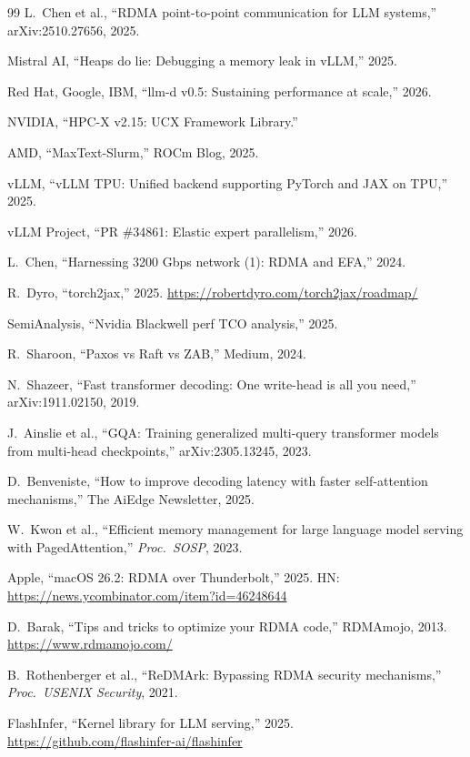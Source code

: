 \documentclass[11pt]{article}
\begin{document}
\begin{thebibliography}{99}
L.~Chen et al., ``RDMA point-to-point communication for LLM systems,'' arXiv:2510.27656, 2025.

Mistral AI, ``Heaps do lie: Debugging a memory leak in vLLM,'' 2025.

Red Hat, Google, IBM, ``llm-d v0.5: Sustaining performance at scale,'' 2026.

NVIDIA, ``HPC-X v2.15: UCX Framework Library.''

AMD, ``MaxText-Slurm,'' ROCm Blog, 2025.

vLLM, ``vLLM TPU: Unified backend supporting PyTorch and JAX on TPU,'' 2025.

vLLM Project, ``PR \#34861: Elastic expert parallelism,'' 2026.

L.~Chen, ``Harnessing 3200 Gbps network (1): RDMA and EFA,'' 2024.

R.~Dyro, ``torch2jax,'' 2025. \url{https://robertdyro.com/torch2jax/roadmap/}

SemiAnalysis, ``Nvidia Blackwell perf TCO analysis,'' 2025.

R.~Sharoon, ``Paxos vs Raft vs ZAB,'' Medium, 2024.

N.~Shazeer, ``Fast transformer decoding: One write-head is all you need,'' arXiv:1911.02150, 2019.

J.~Ainslie et al., ``GQA: Training generalized multi-query transformer models from multi-head checkpoints,'' arXiv:2305.13245, 2023.

D.~Benveniste, ``How to improve decoding latency with faster self-attention mechanisms,'' The AiEdge Newsletter, 2025.

W.~Kwon et al., ``Efficient memory management for large language model serving with PagedAttention,'' \emph{Proc.\ SOSP}, 2023.

Apple, ``macOS 26.2: RDMA over Thunderbolt,'' 2025. HN: \url{https://news.ycombinator.com/item?id=46248644}

D.~Barak, ``Tips and tricks to optimize your RDMA code,'' RDMAmojo, 2013. \url{https://www.rdmamojo.com/}

B.~Rothenberger et al., ``ReDMArk: Bypassing RDMA security mechanisms,'' \emph{Proc.\ USENIX Security}, 2021.

FlashInfer, ``Kernel library for LLM serving,'' 2025. \url{https://github.com/flashinfer-ai/flashinfer}

\end{thebibliography}
\end{document}

